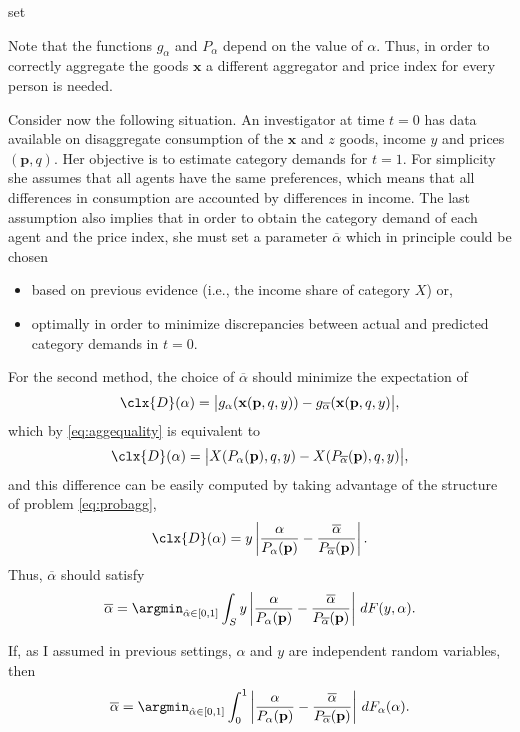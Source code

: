 set\documentclass[english, a4paper,12pt]{article}
\begin{document}
Note that the functions $g_{\alpha}$ and $P_{\alpha}$ depend on the value of $\alpha$. Thus, in order to correctly aggregate the goods $\mathbf{x}$ a different aggregator and price index for every person is needed.

Consider now the following situation. An investigator at time $t = 0$ has data available on disaggregate consumption of the $\mathbf{x}$ and $z$ goods, income $y$ and prices $(\mathbf{p},q)$. Her objective is to estimate category demands for $t=1$. For simplicity she assumes that all agents have the same preferences, which means that all differences in consumption are accounted by differences in income. The last assumption also implies that in order to obtain the category demand of each agent and the price index, she must set a parameter $\overline{\alpha}$ which in principle could be chosen
	\begin{itemize}
		\item based on previous evidence (i.e., the income share of category $X$) or,
		\item optimally in order to minimize discrepancies between actual and predicted category demands in $t = 0$.
	\end{itemize}

For the second method, the choice of $\overline{\alpha}$ should minimize the expectation of
	$$\clx{D}(\alpha) = \big| g_{\alpha}(\mathbf{x}(\mathbf{p}, q, y)) - g_{\overline{\alpha}}(\mathbf{x}(\mathbf{p}, q, y) \big|,$$
which by \eqref{eq:aggequality} is equivalent to
	$$\clx{D}(\alpha) = \big| X(P_{\alpha}(\mathbf{p}), q, y) - X(P_{\overline{\alpha}}(\mathbf{p}), q, y) \big|,$$
and this difference can be easily computed by taking advantage of the structure of problem \eqref{eq:probagg},
	$$\clx{D}(\alpha) = y\left| \frac{\alpha}{P_{\alpha}(\mathbf{p})} - \frac{\overline{\alpha}}{P_{\overline{\alpha}}(\mathbf{p})} \right|.$$
Thus, $\overline{\alpha}$ should satisfy
	\[
		\overline{\alpha}
			=	\argmin_{\hat{\alpha} \in [0,1]} 
					\int_{S} y\left| \frac{\alpha}{P_{\alpha}(\mathbf{p})} 
							- \frac{\overline{\alpha}}{P_{\overline{\alpha}}(\mathbf{p})} \right|\, dF(y,\alpha).
	\]
	
If, as I assumed in previous settings, $\alpha$ and $y$ are independent random variables, then
	\begin{equation} \label{eq:overalpha}
		\overline{\alpha}
			=	\argmin_{\hat{\alpha} \in [0,1]} 
					\int_{0}^{1} \left| \frac{\alpha}{P_{\alpha}(\mathbf{p})} 
							- \frac{\overline{\alpha}}{P_{\overline{\alpha}}(\mathbf{p})} \right|\, dF_{\alpha}(\alpha).
	\end{equation}
	
\end{document}
